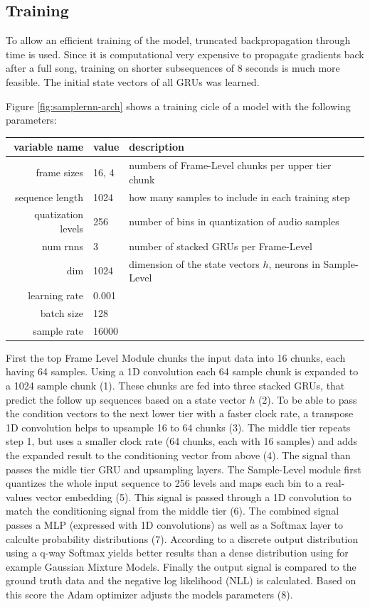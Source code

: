 \documentclass[12pt]{article}
\begin{document}
\subsection{Training}
To allow an efficient training of the model, truncated backpropagation through time is used.
Since it is computational very expensive to propagate gradients back after a full song, training on shorter subsequences of 8 seconds is much more feasible. %
The initial state vectors of all GRUs was learned.

Figure \ref{fig:samplernn-arch} shows a training cicle of a model with the following parameters:
\begin{center}
\begin{tabular}{ r | l | l }
variable name & value & description \\
\hline
frame sizes & 16, 4 & numbers of Frame-Level chunks per upper tier chunk\\
sequence length & 1024 & how many samples to include in each training step\\
quatization levels & 256 & number of bins in quantization of audio samples\\
num rnns & 3 & number of stacked GRUs per Frame-Level \\%
dim & 1024 & dimension of the state vectors $h$, neurons in Sample-Level \\
learning rate & 0.001 & \\
batch size & 128 & \\
sample rate & 16000 & \\
\end{tabular}
\end{center}

First the top Frame Level Module chunks the input data into 16 chunks, each having 64 samples. 
Using a 1D convolution each 64 sample chunk is expanded to a 1024 sample chunk (1).
These chunks are fed into three stacked GRUs, that predict the follow up sequences based on a state vector $h$ (2).
To be able to pass the condition vectors to the next lower tier with a faster clock rate, a transpose 1D convolution helps to upsample 16 to 64 chunks (3).
The middle tier repeats step 1, but uses a smaller clock rate (64 chunks, each with 16 samples) and adds the expanded result to the conditioning vector from above (4).
The signal than passes the midle tier GRU and upsampling layers.
The Sample-Level module first quantizes the whole input sequence to 256 levels and maps each bin to a real-values vector embedding (5).
This signal is passed through a 1D convolution to match the conditioning signal from the middle tier (6).
The combined signal passes a MLP (expressed with 1D convolutions) as well as a Softmax layer to calculte probability distributions (7).
According to \cite{mehri2016samplernn} a discrete output distribution using a q-way Softmax yields better results than a dense distribution using for example Gaussian Mixture Models.
Finally the output signal is compared to the ground truth data and the negative log likelihood (NLL) is calculated.
Based on this score the Adam optimizer adjusts the models parameters (8). 
\end{document}
